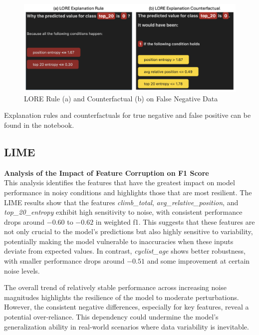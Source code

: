 \begin{figure}[H]
    \centering
    \includegraphics[width=0.7\linewidth]{images//XAI/lore_fn.png}
    \caption{ \small{LORE Rule (a) and Counterfactual (b) on False Negative Data}}
    \label{fig:lore_fn}
\end{figure}

\noindent Explanation rules and counterfactuals for true negative and false positive can be found in the notebook.

\subsection{LIME}

\noindent
\textbf{Analysis of the Impact of Feature Corruption on F1 Score}\\
This analysis identifies the features that have the greatest impact on model performance in noisy conditions and highlights those that are most resilient. The LIME results show that the features \textit{climb\_total}, \textit{avg\_relative\_position}, and \textit{top\_20\_entropy} exhibit high sensitivity to noise, with consistent performance drops around $-0.60$ to $-0.62$ in weighted f1. This suggests that these features are not only crucial to the model's predictions but also highly sensitive to variability, potentially making the model vulnerable to inaccuracies when these inputs deviate from expected values. In contrast, \textit{cyclist\_age} shows better robustness, with smaller performance drops around $-0.51$ and some improvement at certain noise levels. 

The overall trend of relatively stable performance across increasing noise magnitudes highlights the resilience of the model to moderate perturbations. However, the consistent negative differences, especially for key features, reveal a potential over-reliance. This dependency could undermine the model's generalization ability in real-world scenarios where data variability is inevitable.\\

